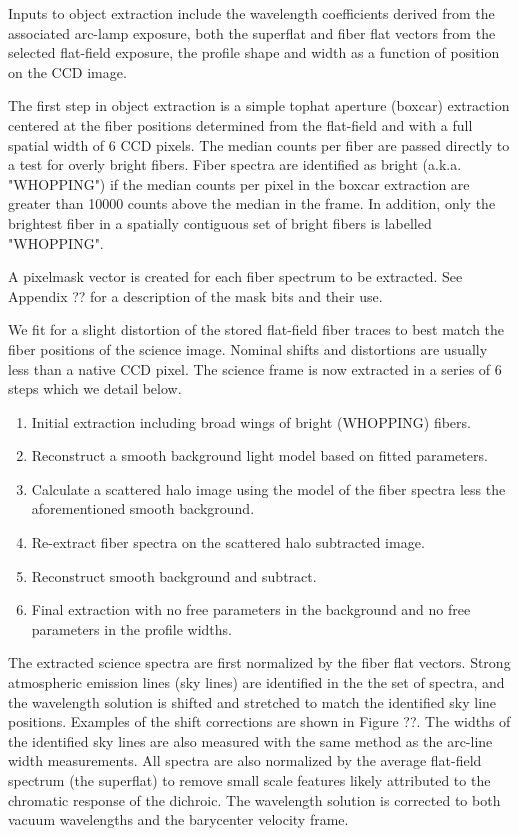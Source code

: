 \documentclass[12pt,preprint]{aastex}
\begin{document}
Inputs to object extraction include the wavelength coefficients derived
from the associated arc-lamp exposure, both the superflat and fiber flat
vectors from the selected flat-field exposure, the profile shape and width
as a function of position on the CCD image.

The first step in object extraction is a simple tophat aperture (boxcar) 
extraction centered at the fiber positions determined from the flat-field 
and with a full spatial width of 6 CCD pixels.  The median counts per fiber 
are passed directly to a test for overly bright fibers. Fiber spectra are 
identified as bright (a.k.a. "WHOPPING") if the median counts per pixel in the 
boxcar extraction are greater than 10000 counts above the median in the 
frame.  In addition, only the brightest fiber in a spatially contiguous set of 
bright fibers is labelled "WHOPPING".  

A pixelmask vector is created for each fiber spectrum to be extracted.
See Appendix ?? for a description of the mask bits and their use.

We fit for a slight distortion of the stored flat-field fiber traces to 
best match the fiber positions of the science image.  Nominal shifts and
distortions are usually less than a native CCD pixel.  The science frame
is now extracted in a series of 6 steps which we detail below.

\begin{enumerate}
\item{Initial extraction including broad wings of bright (WHOPPING) fibers.}
\item{Reconstruct a smooth background light model based on fitted parameters.}
\item{Calculate a scattered halo image using the model of the fiber spectra less
the aforementioned smooth background.}
\item{Re-extract fiber spectra on the scattered halo subtracted image.}
\item{Reconstruct smooth background and subtract.}
\item{Final extraction with no free parameters in the background and
no free parameters in the profile widths.}
\end{enumerate}

The extracted science spectra are first normalized by the fiber flat vectors.
Strong atmospheric emission lines (sky lines) are identified in the the 
set of spectra, and the wavelength solution is shifted and stretched 
to match the identified sky line positions.  
Examples of the shift corrections are shown in Figure ??.  
The widths of the identified sky lines are also measured with the same method
as the arc-line width measurements.  All spectra are also normalized by
the average flat-field spectrum (the superflat) to remove small scale
features likely attributed to the chromatic response of the dichroic.
The wavelength solution is corrected to both vacuum wavelengths and the
barycenter velocity frame.
\end{document}

